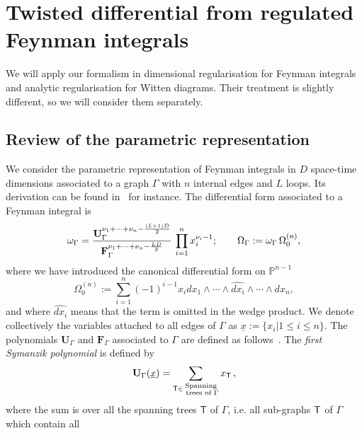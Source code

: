 \documentclass[a4paper,12pt]{article}
\numberwithin{equation}{section}
\numberwithin{figure}{section}
\begin{document}
\section{Twisted differential from regulated Feynman integrals}
\label{sec:parametric}

We will apply our formalism in dimensional regularisation for Feynman integrals and analytic regularisation for Witten diagrams. Their treatment is slightly different, so we will consider them separately. 

\subsection{Review of the parametric representation}
We consider the parametric  representation of Feynman
integrals  in $D$ space-time dimensions associated to a graph $\Gamma$ with $n$   internal edges and $L$ loops. Its derivation can be found  in~\cite{nakanishi1971graph,Vanhove:2014wqa,Bogner:2010kv,Weinzierl:2022eaz} for instance. 
%
The differential form associated to a Feynman integral is 
\begin{equation}\label{e:OmegaDef}
	\omega_\Gamma ={ \textbf{U}_\Gamma ^{\nu_1+\cdots+\nu_n-{(L+1)D\over2}}  \over
  \textbf{F}_\Gamma ^{\nu_1+\cdots+\nu_n-{LD\over2}} }\, \prod_{i=1}^n
x_i^{\nu_i-1}; \qquad 	\Omega_\Gamma :=	\omega_\Gamma \, \Omega^{(n)}_0,
\end{equation}
where we have introduced the  canonical differential form on
$\mathbb P^{n-1}$ 
% 
\begin{equation}
	\Omega_0^{(n)}:=  \sum_{i=1}^n (-1)^{i-1} x_i dx_1\wedge \cdots \wedge \widehat{dx_i} \wedge\cdots \wedge dx_n ,
\end{equation}
and where  $\widehat{dx_i}$ means that the term is omitted in the wedge
product. We denote collectively the 
variables 
attached to all edges of
$\Gamma$ as $\underline x:=\{x_i |1\leq i\leq n\}$. 
%
The polynomials $\textbf{U}_\Gamma$ and $\textbf{F}_\Gamma$
associated to  $\Gamma$ are defined as
follows~\cite{nakanishi1971graph,Bogner:2010kv,Weinzierl:2022eaz}.  The {\em first
	Symanzik polynomial} is defined by
\begin{equation}\label{e:Udef}
	{\bf U}_\Gamma (\underline x)= \sum_{\mathsf{T} \in \substack{ \text{Spanning} \\ \text{ trees of } \Gamma}} x_{\mathsf{T}}\,, 
\end{equation}
where the sum is over all the spanning trees $\mathsf{T}$ of $\Gamma$,  i.e.  all sub-graphs ${\sf T}$ of $\Gamma$ which contain all
\end{document}
